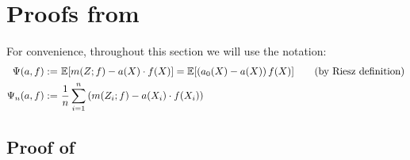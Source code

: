 \section{Proofs from }
For convenience, throughout this section we will use the notation:
\begin{align}
    \Psi(a, f) :=~& \E\brk*{m(Z; f) - a(X)\cdot f(X)} = \E[(a_0(X)-a(X))\, f(X)] \tag{by Riesz definition}\\
    \Psi_n(a, f) :=~& \frac{1}{n}\sum_{i=1}^{n} \left(m(Z_i; f) - a(X_i)\cdot f(X_i)\right)
\end{align}

\subsection{Proof of }

